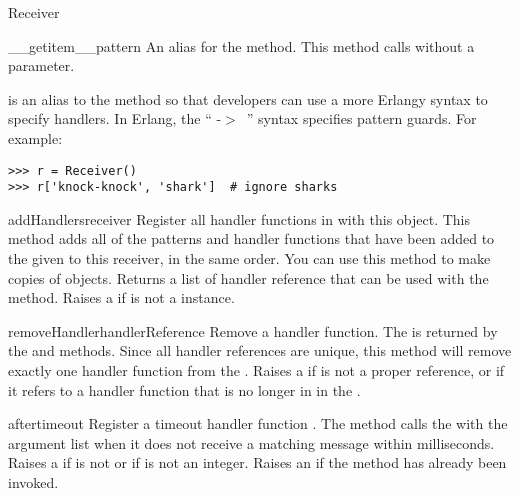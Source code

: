 \documentclass{howto}
\newcommand{\greaterthan}[0]{\begin{math}>\end{math}}
\newcommand{\greaterthan}[0]{>}
\begin{document}
\begin{classdesc}{Receiver}{}
\begin{methoddesc}{__getitem__}{pattern}
\opindex{[]}
An alias for the  method. This method calls
 without a  parameter.

 is an alias to the  method so that
developers can use a more Erlangy syntax to specify handlers. In Erlang, the
`` -\greaterthan\ '' syntax specifies pattern guards. For
example:
\begin{verbatim}
>>> r = Receiver()
>>> r['knock-knock', 'shark']  # ignore sharks
\end{verbatim}
\end{methoddesc}

\begin{methoddesc}{addHandlers}{receiver}
Register all handler functions in  with this 
object. This method adds all of the patterns and handler functions that have
been added to the given  to this receiver, in the same order. You
can use this method to make copies of  objects. Returns a list
of handler reference that can be used with the  method.
Raises a   if  is not a
 instance.
\end{methoddesc}

\begin{methoddesc}{removeHandler}{handlerReference}
Remove a handler function. The  is returned by the
 and  methods. Since all handler
references are unique, this method will remove exactly one handler function
from the . Raises a   if
 is not a proper reference, or if it refers to a handler
function that is no longer in in the .
\end{methoddesc}

\begin{methoddesc}{after}{timeout}
Register a timeout handler function . The  method
calls the  with the  argument list when it does not receive
a matching message within  milliseconds. Raises a 
 if  is not  or if
 is not an integer. Raises an  if the
 method has already been invoked.


\end{methoddesc}
\end{classdesc}
\end{document}
